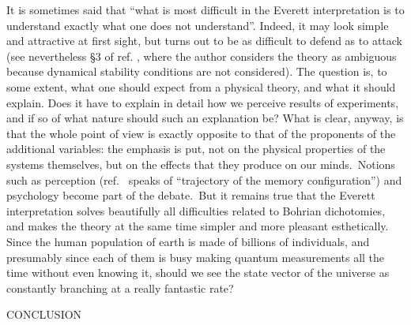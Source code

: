 \documentclass[12pt,onecolumn]{article}%
\begin{document}
It is sometimes said that ``what is most difficult in the Everett
interpretation is to understand exactly what one does not understand''.
Indeed, it may look simple and attractive at first sight, but turns out to be
as difficult to defend as to attack (see nevertheless \S 3 of ref. \cite{Zeh},
where the author considers the theory as ambiguous because dynamical stability
conditions are not considered). The question is, to some extent, what one
should expect from a physical theory, and what it should explain. Does it have
to explain in detail how we perceive results of experiments, and if so of what
nature should such an explanation be? What is clear, anyway, is that the whole
point of view is exactly opposite to that of the proponents of the additional
variables: the emphasis is put, not on the physical properties of the systems
themselves, but on the effects that they produce on our minds.\ Notions such
as perception (ref.\ \cite{Everett} speaks of ``trajectory of the memory
configuration'') and psychology become part of the debate.\ But it remains
true that the Everett interpretation solves beautifully all difficulties
related to Bohrian dichotomies, and makes the theory at the same time simpler
and more pleasant esthetically. Since the human population of earth is made of
billions of individuals, and presumably since each of them is busy making
quantum measurements all the time without even knowing it, should we see the
state vector of the universe as constantly branching at a really fantastic rate?

\begin{center}
CONCLUSION
\end{center}
\end{document}

